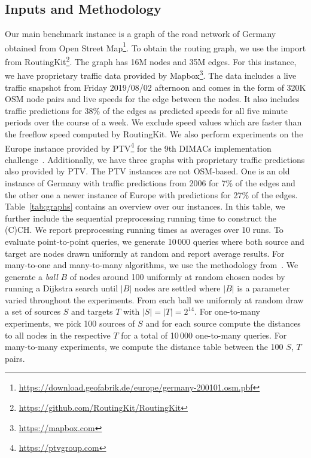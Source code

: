 \documentclass[manuscript,review]{acmart}
\begin{document}
\subsection{Inputs and Methodology}
Our main benchmark instance is a graph of the road network of Germany obtained from Open Street Map\footnote{\url{https://download.geofabrik.de/europe/germany-200101.osm.pbf}}.
To obtain the routing graph, we use the import from RoutingKit\footnote{\url{https://github.com/RoutingKit/RoutingKit}}.
The graph has 16M nodes and 35M edges.
For this instance, we have proprietary traffic data provided by Mapbox\footnote{\url{https://mapbox.com}}.
The data includes a live traffic snapshot from Friday 2019/08/02 afternoon and comes in the form of 320K OSM node pairs and live speeds for the edge between the nodes.
It also includes traffic predictions for 38\% of the edges as predicted speeds for all five minute periods over the course of a week.
We exclude speed values which are faster than the freeflow speed computed by RoutingKit.
We also perform experiments on the Europe instance provided by PTV\footnote{\url{https://ptvgroup.com}} for the 9th DIMACs implementation challenge~\cite{DemetrescuGJ09}.
Additionally, we have three graphs with proprietary traffic predictions also provided by PTV.
The PTV instances are not OSM-based.
One is an old instance of Germany with traffic predictions from 2006 for 7\% of the edges and the other one a newer instance of Europe with predictions for 27\% of the edges.
Table~\ref{tab:graphs} contains an overview over our instances.
In this table, we further include the sequential preprocessing running time to construct the (C)CH.
We report preprocessing running times as averages over 10 runs.
To evaluate point-to-point queries, we generate 10\,000 queries where both source and target are nodes drawn uniformly at random and report average results.
For many-to-one and many-to-many algorithms, we use the methodology from~\cite{delling_et_al:OASIcs:2011:3266}.
We generate a \emph{ball} $B$ of nodes around 100 uniformly at random chosen nodes by running a Dijkstra search until $|B|$ nodes are settled where $|B|$ is a parameter varied throughout the experiments.
From each ball we uniformly at random draw a set of sources $S$ and targets $T$ with $|S| = |T| = 2^{14}$.
For one-to-many experiments, we pick 100 sources of $S$ and for each source compute the distances to all nodes in the respective $T$ for a total of 10\,000 one-to-many queries.
For many-to-many experiments, we compute the distance table between the 100 $S$, $T$ pairs.
\end{document}
